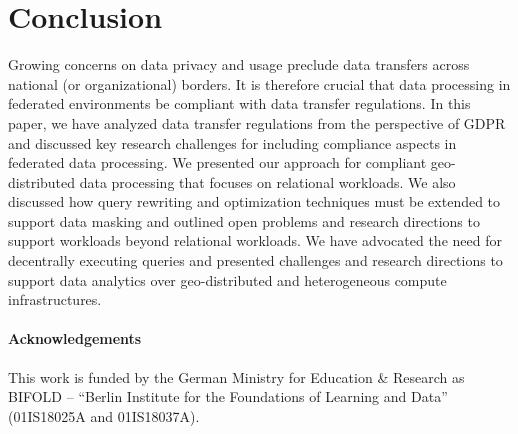 \documentclass[11pt]{article}
\begin{document}
\section{Conclusion}

Growing concerns on data privacy and usage preclude data
transfers across national (or organizational) borders. It is
therefore crucial that data processing in federated
environments be compliant with data transfer regulations. In
this paper, we have analyzed data transfer regulations from
the perspective of GDPR and discussed key research
challenges for including compliance aspects in federated
data processing. We presented our approach for compliant
geo-distributed data processing that focuses on relational
workloads. We also discussed how query rewriting and
optimization techniques must be extended to support data
masking and outlined open problems and research directions
to support workloads beyond relational workloads. We have
advocated the need for decentrally executing queries and
presented challenges and research directions to support data
analytics over geo-distributed and heterogeneous compute
infrastructures.



\paragraph{Acknowledgements}
This work is funded by the German Ministry for Education \&
Research as BIFOLD – ``Berlin Institute for the Foundations
of Learning and Data'' (01IS18025A and 01IS18037A).
\end{document}
